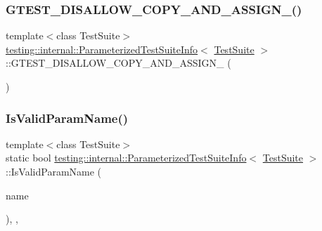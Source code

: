 \subsubsection{\texorpdfstring{GTEST\_DISALLOW\_COPY\_AND\_ASSIGN\_()}{GTEST\_DISALLOW\_COPY\_AND\_ASSIGN\_()}\hspace{0.1cm}{\footnotesize\ttfamily [2/2]}}
{\footnotesize\ttfamily template$<$class Test\+Suite$>$ \\
\mbox{\hyperlink{classtesting_1_1internal_1_1_parameterized_test_suite_info}{testing\+::internal\+::\+Parameterized\+Test\+Suite\+Info}}$<$ \mbox{\hyperlink{classtesting_1_1_test_suite}{Test\+Suite}} $>$\+::G\+T\+E\+S\+T\+\_\+\+D\+I\+S\+A\+L\+L\+O\+W\+\_\+\+C\+O\+P\+Y\+\_\+\+A\+N\+D\+\_\+\+A\+S\+S\+I\+G\+N\+\_\+ (\begin{DoxyParamCaption}\item[{\mbox{\hyperlink{classtesting_1_1internal_1_1_parameterized_test_suite_info}{Parameterized\+Test\+Suite\+Info}}$<$ \mbox{\hyperlink{classtesting_1_1_test_suite}{Test\+Suite}} $>$}]{ }\end{DoxyParamCaption})\hspace{0.3cm}{\ttfamily [private]}}

\mbox{\label{classtesting_1_1internal_1_1_parameterized_test_suite_info_a978b6780b449fc1ad63dec758e899679}} 
\subsubsection{\texorpdfstring{IsValidParamName()}{IsValidParamName()}\hspace{0.1cm}{\footnotesize\ttfamily [1/2]}}
{\footnotesize\ttfamily template$<$class Test\+Suite$>$ \\
static bool \mbox{\hyperlink{classtesting_1_1internal_1_1_parameterized_test_suite_info}{testing\+::internal\+::\+Parameterized\+Test\+Suite\+Info}}$<$ \mbox{\hyperlink{classtesting_1_1_test_suite}{Test\+Suite}} $>$\+::Is\+Valid\+Param\+Name (\begin{DoxyParamCaption}\item[{const std\+::string \&}]{name }\end{DoxyParamCaption})\hspace{0.3cm}{\ttfamily [inline]}, {\ttfamily [static]}, {\ttfamily [private]}}

